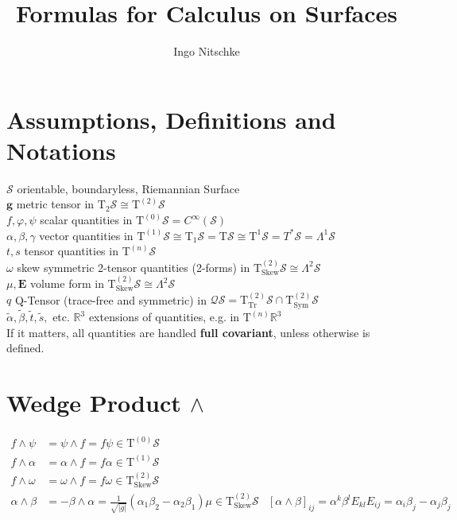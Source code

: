 \documentclass[a4paper,10pt]{scrartcl}
\title{Formulas for Calculus on Surfaces}
\author{Ingo Nitschke}
\newcommand{\surf}{\mathcal{S}}
\newcommand{\T}{\mathrm{T}}
\newcommand{\R}{\mathds{R}}
\newcommand{\tps}[1]{\T^{(#1)}\surf}
\newcommand{\tzs}{\tps{0}}
\newcommand{\tos}{\tps{1}}
\newcommand{\tts}{\tps{2}}
\newcommand{\tns}{\tps{n}}
\newcommand{\tpsprop}[2]{\T^{(#1)}_{#2}\surf}
\newcommand{\ttssym}{\tpsprop{2}{\mathrm{Sym}}}
\newcommand{\ttsskew}{\tpsprop{2}{\mathrm{Skew}}}
\newcommand{\ttstrfree}{\tpsprop{2}{\mathrm{Tr}}}
\newcommand{\qts}{\mathcal{Q}\surf}
\newcommand{\volval}{\sqrt{| g |}}
\newcommand{\gb}{\mathbf{g}}
\newcommand{\Eb}{\mathbf{E}}
\begin{document}
\maketitle
\tableofcontents

\section{Assumptions, Definitions and Notations}
\( \surf \) \dotfill orientable, boundaryless, Riemannian Surface\\
\( \gb \) \dotfill metric tensor in \( \T_{2}\surf \cong \tts \)\\
\( f,\varphi,\psi \) \dotfill scalar quantities in \( \tzs = C^{\infty}\left( \surf \right)\)\\
\( \alpha,\beta,\gamma \) \dotfill vector quantities in \( \tos \cong \T_{1}\surf = \T\surf \cong \T^{1}\surf = T^{*}\surf = \Lambda^{1}\surf \)\\
\( t,s \) \dotfill tensor quantities in \( \tns \)\\
\( \omega \) \dotfill skew symmetric 2-tensor quantities (2-forms) in \( \ttsskew \cong \Lambda^{2}\surf \)\\
\( \mu, \Eb\) \dotfill volume form in \( \ttsskew \cong \Lambda^{2}\surf \)\\
\( q \) \dotfill Q-Tensor (trace-free and symmetric) in \( \qts = \ttstrfree \cap \ttssym \)\\
\( \tilde{\alpha}, \tilde{\beta}, \tilde{t}, \tilde{s}, \) etc. \dotfill \( \R^{3} \) extensions of quantities, e.g. in \( \T^{(n)}\R^{3} \)\\
If it matters, all quantities are handled \textbf{full covariant}, unless otherwise is defined.


\section{Wedge Product \( \wedge \)}
\begin{align*}
  f\wedge\psi &= \psi\wedge f  = f\psi \in \tzs \\
  f\wedge\alpha &= \alpha\wedge f = f\alpha \in \tos\\
  f\wedge\omega &= \omega\wedge f = f\omega \in \ttsskew\\
  \alpha\wedge\beta &= -\beta\wedge\alpha = \frac{1}{\volval}\left( \alpha_{1}\beta_{2} - \alpha_{2}\beta_{1} \right)\mu \in \ttsskew
                  & \left[ \alpha\wedge\beta \right]_{ij} = \alpha^{k}\beta^{l}E_{kl}E_{ij}
                                                          = \alpha_{i}\beta_{j} - \alpha_{j}\beta_{j}
\end{align*}
\end{document}
